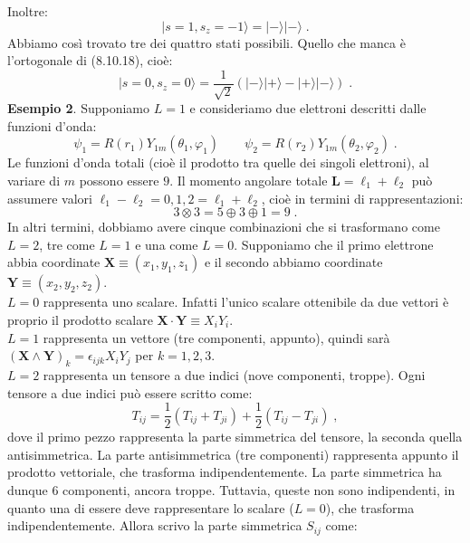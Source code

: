 \documentclass[12pt,a4paper]{report}
\theoremstyle{definition}
\numberwithin{equation}{section}
\newcommand{\ket}{\rangle}
\begin{document}
Inoltre:
\begin{equation}
|s=1,s_z=-1\ket=|-\ket|-\ket\;.
\end{equation}
Abbiamo così trovato tre dei quattro stati possibili. Quello che manca è l'ortogonale di (8.10.18), cioè:
\begin{equation}
|s=0,s_z=0\ket=\frac{1}{\sqrt{2}}(|-\ket|+\ket-|+\ket|-\ket)\;.
\end{equation}
\textbf{Esempio 2}. Supponiamo $L=1$ e consideriamo due elettroni descritti dalle funzioni d'onda:
\begin{equation}
\psi_1=R(r_1)Y_{1m}(\theta_1,\varphi_1) \qquad \psi_2=R(r_2)Y_{1m}(\theta_2,\varphi_2)\;.
\end{equation}
Le funzioni d'onda totali (cioè il prodotto tra quelle dei singoli elettroni), al variare di $m$ possono essere $9$. Il momento angolare totale $\mathbf{L}=\boldsymbol{\ell}_1+\boldsymbol{\ell}_2$ può assumere valori $\ell_1-\ell_2=0,1,2=\ell_1+\ell_2$, cioè in termini di rappresentazioni:
\begin{equation}
3\otimes 3=5\oplus 3\oplus 1=9\;.
\end{equation}
In altri termini, dobbiamo avere cinque combinazioni che si trasformano come $L=2$, tre come $L=1$ e una come $L=0$. Supponiamo che il primo elettrone abbia coordinate $\mathbf{X}\equiv (x_1,y_1,z_1)$ e il secondo abbiamo coordinate $\mathbf{Y}\equiv (x_2,y_2,z_2)$. \\
$L=0$ rappresenta uno scalare. Infatti l'unico scalare ottenibile da due vettori è proprio il prodotto scalare $\mathbf{X}\cdot\mathbf{Y}\equiv X_iY_i$. \\
$L=1$ rappresenta un vettore (tre componenti, appunto), quindi sarà $(\mathbf{X}\wedge\mathbf{Y})_k=\epsilon_{ijk}X_iY_j$ per $k=1,2,3$. \\
$L=2$ rappresenta un tensore a due indici (nove componenti, troppe). Ogni tensore a due indici può essere scritto come:
\begin{equation}
T_{ij}=\frac{1}{2}(T_{ij}+T_{ji})+\frac{1}{2}(T_{ij}-T_{ji})\;,
\end{equation}
dove il primo pezzo rappresenta la parte simmetrica del tensore, la seconda quella antisimmetrica. La parte antisimmetrica (tre componenti) rappresenta appunto il prodotto vettoriale, che trasforma indipendentemente. La parte simmetrica ha dunque $6$ componenti, ancora troppe. Tuttavia, queste non sono indipendenti, in quanto una di essere deve rappresentare lo scalare ($L=0$), che trasforma indipendentemente. Allora scrivo la parte simmetrica $S_{ij}$ come:
\end{document}
